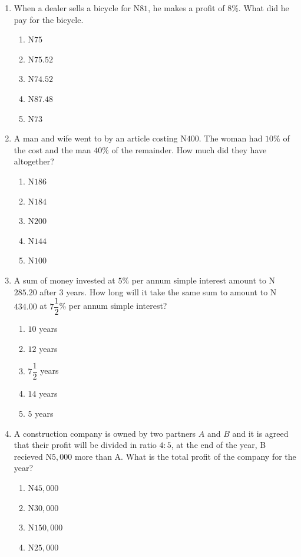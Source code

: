 \begin{multicols}{2}
\begin{enumerate}[label={\arabic*.}]
\begin{enumerate}[label={\Alph*.}]
    \end{enumerate}
\item When a dealer sells a bicycle for N\(81\), he makes a profit of \(8\%\). What did he pay for the bicycle. 
    \begin{enumerate}[label={\Alph*.}]
    \item N\(75\)
    \item N\(75.52\)
    \item N\(74.52\)
    \item N\(87.48\)
    \item N\(73\)
    \end{enumerate}
\item A man and wife went to by an article costing N\(400\). The woman had \(10\%\) of the cost and the man \(40\%\) of the remainder. How much did they have altogether?
    \begin{enumerate}[label={\Alph*.}]
    \item N\(186\)
    \item N\(184\)
    \item N\(200\)
    \item N\(144\)
    \item N\(100\)
    \end{enumerate}
\item A sum of money invested at \(5\%\) per annum simple interest amount to N\(285.20\) after \(3\) years. How long will it take the same sum to amount to N\(434.00\) at \(7{\dfrac{1}{2}}\)\% per annum simple interest?
    \begin{enumerate}[label={\Alph*.}]
    \item \(10\) years
    \item \(12\) years
    \item \(7\dfrac{1}{2}\) years
    \item \(14\) years
    \item \(5\) years
    \end{enumerate}
\item A construction company is owned by two partners \(A\) and \(B\) and it is agreed that their profit will be divided in ratio \(4:5\), at the end of the year, B recieved N\(5,000\) more than A. What is the total profit of the company for the year? 
    \begin{enumerate}[label={\Alph*.}]
    \item N\(45,000\)
    \item N\(30,000\)
    \item N\(150,000\)
    \item N\(25,000\)

\end{enumerate}
\end{enumerate}
\end{multicols}
